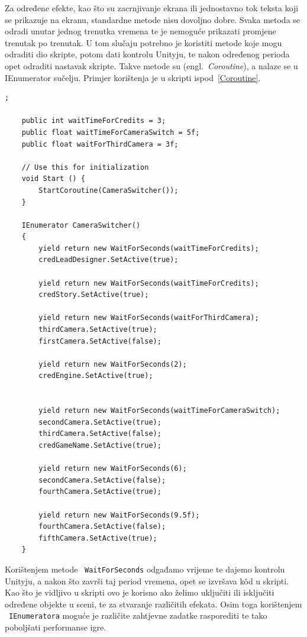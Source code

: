 Za određene efekte, kao što su zacrnjivanje ekrana ili jednostavno tok teksta koji se prikazuje na ekranu, standardne metode nisu dovoljno dobre. Svaka metoda se odradi unutar jednog trenutka vremena te je nemoguće prikazati promjene trenutak po trenutak. U tom slučaju potrebno je koristiti metode koje mogu odraditi dio skripte, potom dati kontrolu Unityju, te nakon određenog perioda opet odraditi nastavak skripte. Takve metode su (engl.~\textit{Coroutine}), a nalaze se u IEnumerator sučelju. Primjer korištenja je u skripti ispod~\ref{Coroutine}.
\begin{lstlisting}[caption={Upravljanje vremenom}, label=Coroutine];

    public int waitTimeForCredits = 3;
    public float waitTimeForCameraSwitch = 5f;
    public float waitForThirdCamera = 3f;

	// Use this for initialization
	void Start () {
        StartCoroutine(CameraSwitcher());
	}

    IEnumerator CameraSwitcher()
    {
        yield return new WaitForSeconds(waitTimeForCredits);
        credLeadDesigner.SetActive(true);

        yield return new WaitForSeconds(waitTimeForCredits);
        credStory.SetActive(true);

        yield return new WaitForSeconds(waitForThirdCamera);
        thirdCamera.SetActive(true);
        firstCamera.SetActive(false);

        yield return new WaitForSeconds(2);
        credEngine.SetActive(true);


        yield return new WaitForSeconds(waitTimeForCameraSwitch);
        secondCamera.SetActive(true);
        thirdCamera.SetActive(false);
        credGameName.SetActive(true);

        yield return new WaitForSeconds(6);
        secondCamera.SetActive(false);
        fourthCamera.SetActive(true);

        yield return new WaitForSeconds(9.5f);
        fourthCamera.SetActive(false);
        fifthCamera.SetActive(true);
    }
\end{lstlisting}

Korištenjem metode ~\texttt{WaitForSeconds} odgađamo vrijeme te dajemo kontrolu Unityju, a nakon što završi taj period vremena, opet se izvršava k\^od u skripti. Kao što je vidljivo u skripti ovo je korisno ako želimo uključiti ili isključiti određene objekte u sceni, te za stvaranje različitih efekata. Osim toga korištenjem ~\texttt{IEnumeratora} moguće je različite zahtjevne zadatke rasporediti te tako poboljšati performanse igre.

